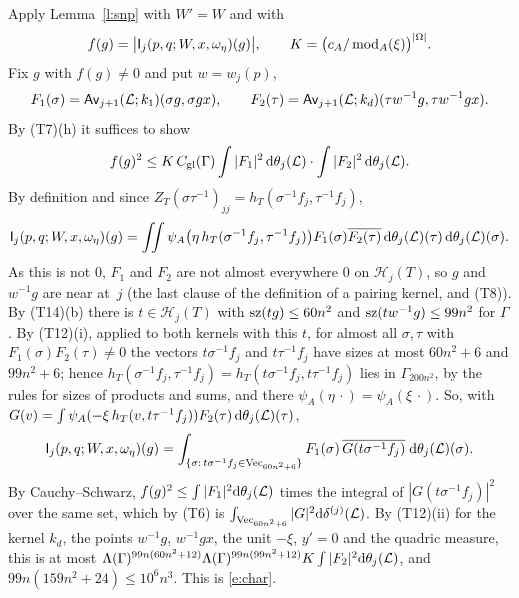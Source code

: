 \documentclass[11pt,a4paper]{article}
\makeatletter
\newcommand{\m}[1]{\mbox{$#1$}}        %
\theoremstyle{plainx}
\theoremstyle{uprightx}
\renewenvironment{proof}[1][Proof]{\par\pushQED{\qed}\normalfont\topsep0pt\partopsep0pt
  \trivlist\item[\hskip\labelsep\itshape #1.]\ignorespaces}{\popQED\endtrivlist\@endpefalse}
\newcommand{\cL}{\mathcal{L}}
\newcommand{\dd}{\mathrm{d}}
\newcommand{\Hl}[2]{\mathcal{H}_{#1}(#2)}
\newcommand{\modA}{\operatorname{mod}_A}
\newcommand{\ZT}[2]{Z_{#1}(#2)}
\newcommand{\wl}[2]{w_{#1}(#2)}
\newcommand{\quadric}[2]{\delta^{(#2)}(#1)}
\newcommand{\Inp}[1]{\textup{(#1)}}
\makeatother
\begin{document}
\begin{proof}[Proof of Theorem A\textup{(b)}]
Apply Lemma~\ref{l:snp} with $W'=W$ and with
\[f(g)=\bigl|\formIntegrand{j}{p}{q}{W}{x}{\omega_\eta}{g}\bigr|,\qquad K=\bigl(c_A/\modA(\xi)\bigr)^{|\Omega|}.\]
Fix $g$ with $f(g)\ne0$ and put $w=\wl{j}{p}$,
\[F_1(\sigma)=\upperPairing{\cL}{j+1}{k_1}{\sigma g}{\sigma gx},\qquad
F_2(\tau)=\upperPairing{\cL}{j+1}{k_d}{\tau w^{-1}g}{\tau w^{-1}gx}.\]
By \Inp{T7}(h) it suffices to show
\begin{equation}\label{e:char}
f(g)^{2}\le K\,\globalConst{\Gamma}\int|F_1|^{2}\,\dd\floorMeasure{\cL}{j}\cdot\int|F_2|^{2}\,\dd\floorMeasure{\cL}{j}.
\end{equation}
By definition and since $\ZT{T}{\sigma\tau^{-1}}_{jj}=h_T(\sigma^{-1}f_j,\tau^{-1}f_j)$,
\[\formIntegrand{j}{p}{q}{W}{x}{\omega_\eta}{g}=\iint\psi_A\bigl(\eta\,h_T(\sigma^{-1}f_j,\tau^{-1}f_j)\bigr)F_1(\sigma)\overline{F_2(\tau)}\,
\dd\floorMeasure{\cL}{j}(\tau)\,\dd\floorMeasure{\cL}{j}(\sigma).\]
As this is not $0$, $F_1$ and $F_2$ are not almost everywhere $0$ on $\Hl{j}{T}$, so $g$ and $w^{-1}g$ are near
at~$j$ (the last clause of the definition of a pairing kernel, and \Inp{T8}). By \Inp{T14}(b) there is
$t\in\Hl{j}{T}$ with \m{\HasMatSize{60n^2}{tg}} and \m{\HasMatSize{99n^2}{tw^{-1}g}} for $\Gamma$. By \Inp{T12}(i),
applied to both kernels with this $t$, for almost all $\sigma,\tau$ with $F_1(\sigma)F_2(\tau)\ne0$ the vectors
$t\sigma^{-1}f_j$ and $t\tau^{-1}f_j$ have sizes at most $60n^2+6$ and $99n^2+6$; hence
$h_T(\sigma^{-1}f_j,\tau^{-1}f_j)=h_T(t\sigma^{-1}f_j,t\tau^{-1}f_j)$ lies in $\Gamma_{200n^2}$, by the rules for
sizes of products and sums, and there $\psi_A(\eta\,\cdot)=\psi_A(\xi\,\cdot)$. So, with
$G(v)=\int\psi_A(-\xi\,h_T(v,t\tau^{-1}f_j))F_2(\tau)\,\dd\floorMeasure{\cL}{j}(\tau)$,
\[\formIntegrand{j}{p}{q}{W}{x}{\omega_\eta}{g}=\int_{\{\sigma:\,t\sigma^{-1}f_j\in\vecsOfSize{60n^2+6}\}}F_1(\sigma)\,\overline{G(t\sigma^{-1}f_j)}\;\dd\floorMeasure{\cL}{j}(\sigma).\]
By Cauchy--Schwarz, $f(g)^2\le\int|F_1|^2\dd\floorMeasure{\cL}{j}$ times the integral of
$|G(t\sigma^{-1}f_j)|^2$ over the same set, which by \Inp{T6} is $\int_{\vecsOfSize{60n^2+6}}|G|^2\dd\quadric{\cL}{j}$.
By \Inp{T12}(ii) for the kernel $k_d$, the points $w^{-1}g$, $w^{-1}gx$, the unit $-\xi$, $y'=0$ and the quadric
measure, this is at most $\Lambda(\Gamma)^{99n(60n^2+12)}\Lambda(\Gamma)^{99n(99n^2+12)}K\int|F_2|^2\dd\floorMeasure{\cL}{j}$,
and $99n(159n^2+24)\le10^6n^3$. This is \eqref{e:char}.
\end{proof}
\end{document}
